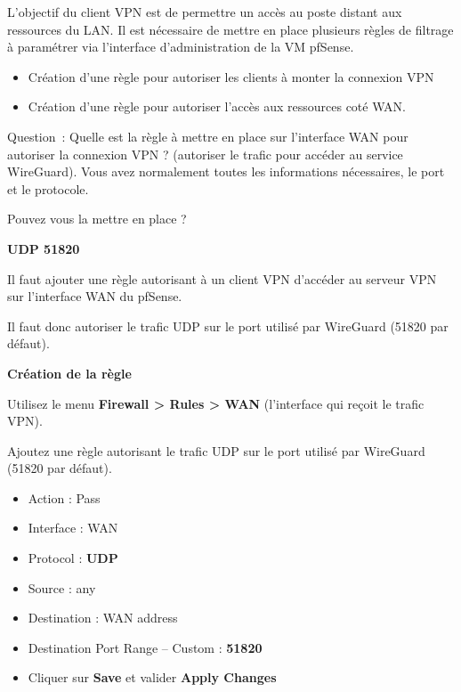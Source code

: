 \noindent L'objectif du client VPN est de permettre un accès au poste distant aux ressources du LAN. Il est nécessaire de mettre en place plusieurs règles de filtrage à paramétrer via l'interface d'administration de la VM pfSense.

\begin{itemize}
  \item Création d’une règle pour autoriser les clients à monter la connexion VPN
  \item Création d’une règle pour autoriser l’accès aux ressources coté WAN.
\end{itemize}

\vspace{0.5cm}

Question~: Quelle est la règle à mettre en place sur l'interface WAN pour autoriser la connexion VPN ? (autoriser le trafic pour accéder au service WireGuard). Vous avez normalement toutes les informations nécessaires, le port et le protocole.

\noindent Pouvez vous la mettre en place ?

\vspace{0.5cm}

\noindent \textbf{UDP 51820}

\noindent Il faut ajouter une règle autorisant à un client VPN d'accéder au serveur VPN sur l'interface WAN du pfSense.

\noindent Il faut donc autoriser le trafic UDP sur le port utilisé par WireGuard (51820 par défaut).

\noindent \textbf{Création de la règle}

\noindent Utilisez le menu \textbf{Firewall > Rules > WAN} (l’interface qui reçoit le trafic VPN).

\noindent Ajoutez une règle autorisant le trafic UDP sur le port utilisé par WireGuard (51820 par défaut).

\begin{itemize}
  \item Action : Pass
  \item Interface : WAN
  \item Protocol : \textbf{UDP}
  \item Source : any
  \item Destination : WAN address
  \item Destination Port Range – Custom : \textbf{51820}
  \item Cliquer sur \textbf{Save} et valider \textbf{Apply Changes}
\end{itemize}


